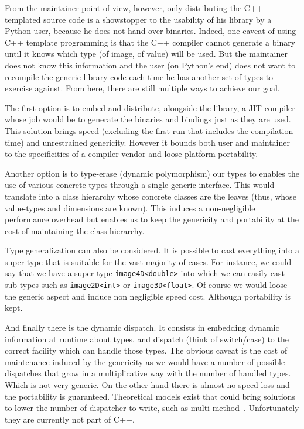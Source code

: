 From the maintainer point of view, however, only distributing the C++ templated source code is a showstopper to the
usability of his library by a Python user, because he does not hand over binaries. Indeed, one caveat of using C++
template programming is that the C++ compiler cannot generate a binary until it knows which type (of image, of value)
will be used. But the maintainer does not know this information and the user (on Python's end) does not want to
recompile the generic library code each time he has another set of types to exercise against. From here, there are still
multiple ways to achieve our goal.

The first option is to embed and distribute, alongside the library, a JIT compiler whose job would be to generate the
binaries and bindings just as they are used. This solution brings speed (excluding the first run that includes the
compilation time) and unrestrained genericity. However it bounds both user and maintainer to the specificities of a
compiler vendor and loose platform portability.

Another option is to type-erase (dynamic polymorphism) our types to enables the use of various concrete types through a
single generic interface. This would translate into a class hierarchy whose concrete classes are the leaves (thus, whose
value-types and dimensions are known). This induces a non-negligible performance overhead but enables us to keep the
genericity and portability at the cost of maintaining the class hierarchy.

Type generalization can also be considered. It is possible to cast everything into a super-type that is suitable for the
vast majority of cases. For instance, we could say that we have a super-type \texttt{image4D<double>} into which we can
easily cast sub-types such as \texttt{image2D<int>} or \texttt{image3D<float>}. Of course we would loose the generic
aspect and induce non negligible speed cost. Although portability is kept.

And finally there is the dynamic dispatch. It consists in embedding dynamic information at runtime about types, and
dispatch (think of switch/case) to the correct facility which can handle those types. The obvious caveat is the cost of
maintenance induced by the genericity as we would have a number of possible dispatches that grow in a multiplicative way
with the number of handled types. Which is not very generic. On the other hand there is almost no speed loss and the
portability is guaranteed. Theoretical models exist that could bring solutions to lower the number of dispatcher to
write, such as multi-method~\cite{pirkelbauer.2010.multimethods}. Unfortunately they are currently not part of C++.


